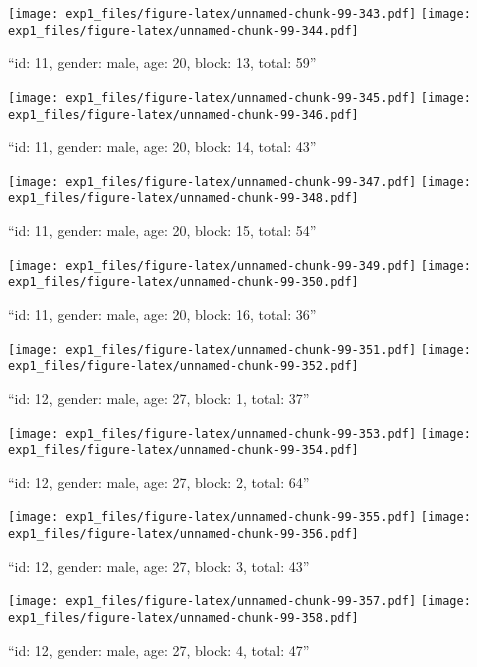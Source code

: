\documentclass[,]{article}
\begin{document}
\texttt{[image: exp1\_files/figure-latex/unnamed-chunk-99-343.pdf]}
\texttt{[image: exp1\_files/figure-latex/unnamed-chunk-99-344.pdf]}

\newpage
[1] 

``id: 11, gender: male, age: 20, block: 13, total: 59''

\texttt{[image: exp1\_files/figure-latex/unnamed-chunk-99-345.pdf]}
\texttt{[image: exp1\_files/figure-latex/unnamed-chunk-99-346.pdf]}

\newpage
[1] 

``id: 11, gender: male, age: 20, block: 14, total: 43''

\texttt{[image: exp1\_files/figure-latex/unnamed-chunk-99-347.pdf]}
\texttt{[image: exp1\_files/figure-latex/unnamed-chunk-99-348.pdf]}

\newpage
[1] 

``id: 11, gender: male, age: 20, block: 15, total: 54''

\texttt{[image: exp1\_files/figure-latex/unnamed-chunk-99-349.pdf]}
\texttt{[image: exp1\_files/figure-latex/unnamed-chunk-99-350.pdf]}

\newpage
[1] 

``id: 11, gender: male, age: 20, block: 16, total: 36''

\texttt{[image: exp1\_files/figure-latex/unnamed-chunk-99-351.pdf]}
\texttt{[image: exp1\_files/figure-latex/unnamed-chunk-99-352.pdf]}

\newpage
[1] 

``id: 12, gender: male, age: 27, block: 1, total: 37''

\texttt{[image: exp1\_files/figure-latex/unnamed-chunk-99-353.pdf]}
\texttt{[image: exp1\_files/figure-latex/unnamed-chunk-99-354.pdf]}

\newpage
[1] 

``id: 12, gender: male, age: 27, block: 2, total: 64''

\texttt{[image: exp1\_files/figure-latex/unnamed-chunk-99-355.pdf]}
\texttt{[image: exp1\_files/figure-latex/unnamed-chunk-99-356.pdf]}

\newpage
[1] 

``id: 12, gender: male, age: 27, block: 3, total: 43''

\texttt{[image: exp1\_files/figure-latex/unnamed-chunk-99-357.pdf]}
\texttt{[image: exp1\_files/figure-latex/unnamed-chunk-99-358.pdf]}

\newpage
[1] 

``id: 12, gender: male, age: 27, block: 4, total: 47''
\end{document}
